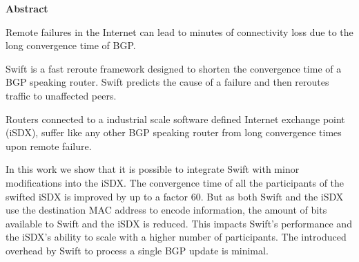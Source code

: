 \clearpage
\null
\vfil %
\thispagestyle{plain}
\begin{center}\textbf{Abstract}\end{center}
Remote failures in the Internet can lead to minutes of connectivity loss due to the long convergence time of BGP.

Swift is a fast reroute framework designed to shorten the convergence time of a BGP speaking router. Swift predicts the cause of a failure and then reroutes traffic to unaffected peers.  

Routers connected to a industrial scale software defined Internet exchange point (iSDX), suffer like any other BGP speaking router from long convergence times upon remote failure. 

In this work we show that it is possible to integrate Swift with minor modifications into the iSDX. The convergence time of all the participants of the swifted iSDX is improved by up to a factor 60. But as both Swift and the iSDX use the destination MAC address to encode information, the amount of bits available to Swift and the iSDX is reduced. This impacts Swift's performance and the iSDX's ability to scale with a higher number of participants. The introduced overhead by Swift to process a single BGP update is minimal. 
\vfil
\clearpage 

